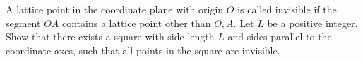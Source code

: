 A lattice point in the coordinate plane with origin $O$ is called invisible if the segment $OA$ contains a lattice point other than $O,A$. Let $L$ be a positive integer. Show that there exists a square with side length $L$ and sides parallel to the coordinate axes, such that all points in the square are invisible.